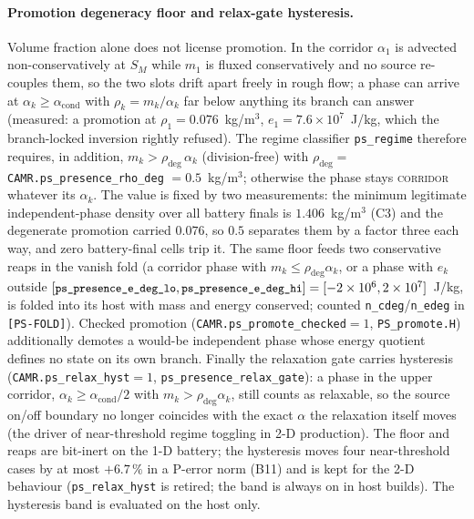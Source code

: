 \documentclass[11pt,a4paper]{article}
\newcommand{\code}[1]{\texttt{\small #1}}
\begin{document}
\paragraph{Promotion degeneracy floor and relax-gate hysteresis.}
Volume fraction alone does not license promotion.  In the corridor
$\alpha_1$ is advected non-conservatively at $S_M$ while $m_1$ is fluxed
conservatively and no source re-couples them, so the two slots drift apart
freely in rough flow; a phase can arrive at $\alpha_k\ge\alpha_{\mathrm{cond}}$
with $\rho_k=m_k/\alpha_k$ far below anything its branch can answer
(measured: a promotion at $\rho_1=0.076$~kg/m$^3$, $e_1=7.6\times10^{7}$~J/kg,
which the branch-locked inversion rightly refused).  The regime classifier
\code{ps\_regime} therefore requires, in addition, $m_k>\rho_{\mathrm{deg}}\,\alpha_k$
(division-free) with $\rho_{\mathrm{deg}}=$ \code{CAMR.ps\_presence\_rho\_deg}
$=0.5$~kg/m$^3$; otherwise the phase stays \textsc{corridor} whatever its
$\alpha_k$.  The value is fixed by two measurements: the minimum legitimate
independent-phase density over all battery finals is $1.406$~kg/m$^3$ (C3) and
the degenerate promotion carried $0.076$, so $0.5$ separates them by a factor
three each way, and zero battery-final cells trip it.  The same floor feeds
two conservative reaps in the vanish fold (a corridor phase with
$m_k\le\rho_{\mathrm{deg}}\alpha_k$, or a phase with $e_k$ outside
$[\code{ps\_presence\_e\_deg\_lo},\code{ps\_presence\_e\_deg\_hi}]=[-2\times10^{6},2\times10^{7}]$~J/kg,
is folded into its host with mass and energy conserved; counted
\code{n\_cdeg}/\code{n\_edeg} in \code{[PS-FOLD]}).  Checked promotion
(\code{CAMR.ps\_promote\_checked}$=1$, \code{PS\_promote.H}) additionally
demotes a would-be independent phase whose energy quotient defines no state
on its own branch.  Finally the relaxation gate carries hysteresis
(\code{CAMR.ps\_relax\_hyst}$=1$, \code{ps\_presence\_relax\_gate}): a phase in
the upper corridor, $\alpha_k\ge\alpha_{\mathrm{cond}}/2$ with
$m_k>\rho_{\mathrm{deg}}\alpha_k$, still counts as relaxable, so the source
on/off boundary no longer coincides with the exact $\alpha$ the relaxation
itself moves (the driver of near-threshold regime toggling in 2-D
production).  The floor and reaps are bit-inert on the 1-D battery; the
hysteresis moves four near-threshold cases by at most $+6.7\,\%$ in a P-error
norm (B11) and is kept for the 2-D behaviour (\code{ps\_relax\_hyst} is
retired; the band is always on in host builds).  The hysteresis band is evaluated on the host only.
\end{document}
